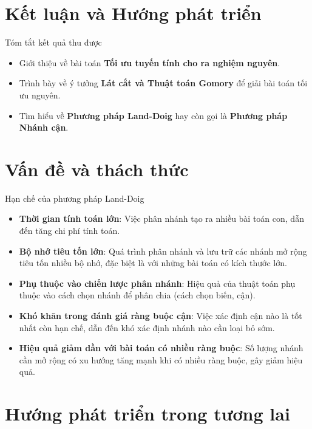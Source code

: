 \documentclass[10pt]{beamer}
\begin{document}
\section{Kết luận và Hướng phát triển}
\begin{frame}{Tóm tắt kết quả thu được}
\bigskip
\begin{itemize}
    \item<2-> Giới thiệu về bài toán \textbf{Tối ưu tuyến tính cho ra nghiệm nguyên}.
    \medskip
    \item<3-> Trình bày về ý tưởng \textbf{Lát cắt và Thuật toán Gomory} để giải bài toán tối ưu nguyên.
    \medskip
	\item<4-> Tìm hiểu về \textbf{Phương pháp Land-Doig} hay còn gọi là \textbf{Phương pháp Nhánh cận}.
\end{itemize}
\end{frame}
\section*{Vấn đề và thách thức}
\begin{frame}{Hạn chế của phương pháp Land-Doig}
\begin{itemize}
    \item<1-> \textbf{Thời gian tính toán lớn}: Việc phân nhánh tạo ra nhiều bài toán con, dẫn đến tăng chi phí tính toán.
    \item<2-> \textbf{Bộ nhớ tiêu tốn lớn}: Quá trình phân nhánh và lưu trữ các nhánh mở rộng tiêu tốn nhiều bộ nhớ, đặc biệt là với những bài toán có kích thước lớn.
    \item<3-> \textbf{Phụ thuộc vào chiến lược phân nhánh}: Hiệu quả của thuật toán phụ thuộc vào cách chọn nhánh để phân chia (cách chọn biến, cận).
    \item<4-> \textbf{Khó khăn trong đánh giá ràng buộc cận}: Việc xác định cận nào là tốt nhất còn hạn chế, dẫn đến khó xác định nhánh nào cần loại bỏ sớm.
    \item<5-> \textbf{Hiệu quả giảm dần với bài toán có nhiều ràng buộc}: Số lượng nhánh cần mở rộng có xu hướng tăng mạnh khi có nhiều ràng buộc, gây giảm hiệu quả.
\end{itemize}
\end{frame}

\section*{Hướng phát triển trong tương lai}
\end{document}
